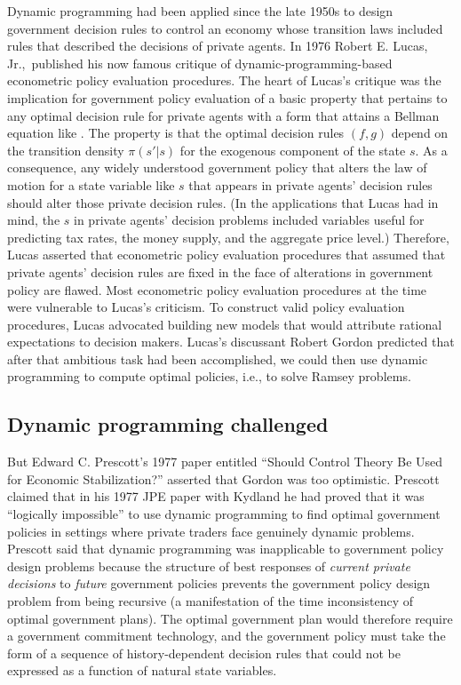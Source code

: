 Dynamic programming had been applied since the late 1950s
to  design government decision rules
to control an economy whose transition laws included
rules that described the decisions of private agents.
 In  1976 Robert E. Lucas, Jr.,\ published his now famous critique of
dynamic-programming-based econometric
policy evaluation procedures.
 The heart of Lucas's critique was
the implication for government policy evaluation of
a basic property that pertains to any optimal decision rule
for private agents with a form
  that attains a Bellman equation like .
The property is that the optimal decision rules $(f,g)$ depend on
the transition density $\pi(s'|s)$ for the exogenous component of
the state $s$. As a consequence, any widely understood government
policy that alters the law of motion for a state variable like
$s$ that appears in private agents' decision rules should alter
those private decision rules.    (In the applications that Lucas
had in mind, the $s$ in private agents' decision problems included
variables useful for predicting tax rates, the money supply, and
the aggregate price level.)  Therefore, Lucas asserted that
econometric policy
evaluation procedures that assumed that private agents' decision
rules are fixed in the face of alterations in government policy
are flawed.
 Most econometric policy evaluation procedures at the time
were vulnerable to Lucas's criticism.
 To construct valid policy evaluation procedures,
 Lucas advocated building new models that
would attribute rational expectations to decision makers.
Lucas's discussant Robert Gordon predicted that after that ambitious
task had been accomplished, we could then use dynamic programming
to compute optimal policies, i.e., to solve Ramsey problems.


\subsection{Dynamic programming  challenged}
But Edward C.
 Prescott's 1977 paper
entitled ``Should Control  Theory Be Used for Economic Stabilization?''
asserted that Gordon was too optimistic.
Prescott
claimed that in his 1977 JPE paper with
Kydland he had proved that
it was ``logically impossible'' to use dynamic programming to  find
optimal government policies in settings where  private traders
face genuinely dynamic problems.  Prescott
said that  dynamic programming was inapplicable to government policy
design problems because the structure of 
best responses of {\it current private decisions\/} to {\it future\/}
government policies prevents the government policy design problem from
being recursive (a
manifestation of the time inconsistency of optimal government plans).
The optimal government plan would therefore require a  government
commitment technology, and the government policy
must take the form of a sequence of history-dependent
decision rules that could not be expressed as a function
of natural state variables.

